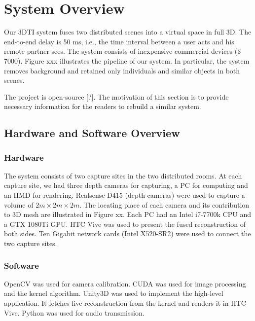 \section{System Overview}

Our 3DTI system fuses two distributed scenes into a virtual space in full 3D. The end-to-end delay is 50 ms, i.e., the time interval between a user acts and his remote partner sees. The system consists of inexpensive commercial devices (\$ 7000). Figure xxx illustrates the pipeline of our system. In particular, the system removes background and retained only individuals and similar objects in both scenes.

The project is open-source [?]. The motivation of this section is to provide necessary information for the readers to rebuild a similar system.


\subsection{Hardware and Software Overview}

\subsubsection{Hardware}

The system consists of two capture sites in the two distributed rooms. At each capture site, we had three depth cameras for capturing, a PC for computing and an HMD for rendering. Realsense D415 (depth cameras) were used to capture a volume of $2m \times 2m \times 2m$. The locating place of each camera and its contribution to 3D mesh are illustrated in Figure xx. Each PC had an Intel i7-7700k CPU and a GTX 1080Ti GPU. HTC Vive was used to present the fused reconstruction of both sides. Ten Gigabit network cards (Intel X520-SR2) were used to connect the two capture sites.

\subsubsection{Software}

OpenCV was used for camera calibration. CUDA was used for image processing and the kernel algorithm. Unity3D was used to implement the high-level application. It fetches live reconstruction from the kernel and renders it in HTC Vive. Python was used for audio transmission.

